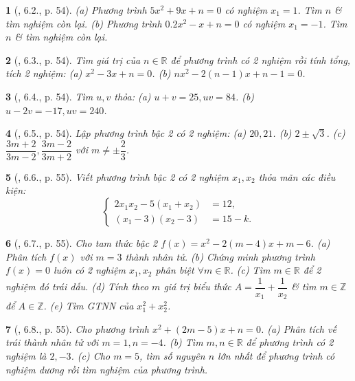\documentclass{article}
\newtheorem{baitoan}{}
\begin{document}
\begin{baitoan}[\cite{Binh_boi_duong_Toan_9_tap_2}, 6.2., p. 54]
	(a) Phương trình $5x^2 + 9x + n = 0$ có nghiệm $x_1 = 1$. Tìm $n$ \& tìm nghiệm còn lại. (b) Phương trình $0.2x^2 - x + n = 0$ có nghiệm $x_1 = -1$. Tìm $n$ \& tìm nghiệm còn lại.
\end{baitoan}

\begin{baitoan}[\cite{Binh_boi_duong_Toan_9_tap_2}, 6.3., p. 54]
	Tìm giá trị của $n\in\mathbb{R}$ để phương trình có 2 nghiệm rồi tính tổng, tích 2 nghiệm: (a) $x^2 - 3x + n = 0$. (b) $nx^2 - 2(n - 1)x + n - 1 = 0$.
\end{baitoan}

\begin{baitoan}[\cite{Binh_boi_duong_Toan_9_tap_2}, 6.4., p. 54]
	Tìm $u,v$ thỏa: (a) $u + v = 25,uv = 84$. (b) $u - 2v = -17,uv = 240$.
\end{baitoan}

\begin{baitoan}[\cite{Binh_boi_duong_Toan_9_tap_2}, 6.5., p. 54]
	Lập phương trình bậc 2 có 2 nghiệm: (a) $20,21$. (b) $2\pm\sqrt{3}$. (c) $\dfrac{3m + 2}{3m - 2},\dfrac{3m - 2}{3m + 2}$ với $m\ne\pm\dfrac{2}{3}$.
\end{baitoan}

\begin{baitoan}[\cite{Binh_boi_duong_Toan_9_tap_2}, 6.6., p. 55]
	Viết phương trình bậc 2 có 2 nghiệm $x_1,x_2$ thỏa mãn các điều kiện:
	\begin{equation*}
		\left\{\begin{split}
			2x_1x_2 - 5(x_1 + x_2) &= 12,\\
			(x_1 - 3)(x_2 - 3) &= 15 - k.
		\end{split}\right.
	\end{equation*}
\end{baitoan}

\begin{baitoan}[\cite{Binh_boi_duong_Toan_9_tap_2}, 6.7., p. 55]
	Cho tam thức bậc 2 $f(x) = x^2 - 2(m - 4)x + m - 6$. (a) Phân tích $f(x)$ với $m = 3$ thành nhân tử. (b) Chứng minh phương trình $f(x) = 0$ luôn có 2 nghiệm $x_1,x_2$ phân biệt $\forall m\in\mathbb{R}$. (c) Tìm $m\in\mathbb{R}$ để 2 nghiệm đó trái dấu. (d) Tính theo $m$ giá trị biểu thức $A = \dfrac{1}{x_1} + \dfrac{1}{x_2}$ \& tìm $m\in\mathbb{Z}$ để $A\in\mathbb{Z}$. (e) Tìm {\rm GTNN} của $x_1^2 + x_2^2$.
\end{baitoan}

\begin{baitoan}[\cite{Binh_boi_duong_Toan_9_tap_2}, 6.8., p. 55]
	Cho phương trình $x^2 + (2m - 5)x + n = 0$. (a) Phân tích vế trái thành nhân tử với $m = 1,n = -4$. (b) Tìm $m,n\in\mathbb{R}$ để phương trình có 2 nghiệm là $2,-3$. (c) Cho $m = 5$, tìm số nguyên $n$ lớn nhất để phương trình có nghiệm dương rồi tìm nghiệm của phương trình.
\end{baitoan}
\end{document}
